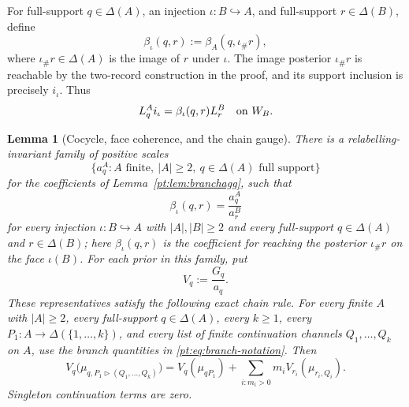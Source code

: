 \documentclass[11pt,a4paper]{article}
\newtheorem{lemma}[theorem]{Lemma}
\theoremstyle{definition}
\newcommand{\D}{\Delta}
\newcommand{\1}{\mathbf 1}
\begin{document}
For full-support $q\in\Delta(A)$, an injection
$\iota:B\hookrightarrow A$, and full-support $r\in\Delta(B)$, define
\[
 \beta_\iota(q,r):=\beta_A(q,\iota_\#r),
\]
where $\iota_\#r\in\D(A)$ is the image of $r$ under $\iota$.  The image posterior $\iota_\#r$ is reachable by the two-record construction
in the proof, and its support inclusion is precisely $i_\iota$.  Thus
\[
 L_q^A i_\iota=\beta_\iota(q,r)L_r^B
 \quad\hbox{on }W_B.
\]

\begin{lemma}[Cocycle, face coherence, and the chain gauge]
\label{pt:lem:chain}
There is a relabelling-invariant family of positive scales
\[
\{a_q^A: A\text{ finite},\ |A|\ge2,\ q\in\Delta(A)\text{ full support}\}
\]
for the coefficients of Lemma~\ref{pt:lem:branchagg}, such that
\begin{equation}
 \beta_\iota(q,r)=\frac{a_q^A}{a_r^B}
\tag{FS}\label{pt:eq:facescale}
\end{equation}
for every injection $\iota:B\hookrightarrow A$ with $|A|,|B|\ge2$ and every
full-support $q\in\Delta(A)$ and $r\in\Delta(B)$; here
$\beta_\iota(q,r)$ is the coefficient for reaching the posterior
$\iota_\#r$ on the face $\iota(B)$.  For each prior in this family, put
\[
 V_q:=\frac{G_q}{a_q}.
\]
These representatives satisfy the following exact chain rule.  For every
finite $A$ with $|A|\ge2$, every full-support $q\in\Delta(A)$, every $k\ge1$,
every $P_1:A\to\Delta(\{1,\ldots,k\})$, and every list of finite continuation
channels $Q_1,\ldots,Q_k$ on $A$, use the branch quantities in
\eqref{pt:eq:branch-notation}.  Then
\begin{equation}
 V_q\bigl(\mu_{q,P_1\triangleright(Q_1,\ldots,Q_k)}\bigr)
 =V_q(\mu_{qP_1})
  +\sum_{i:m_i>0}m_iV_{r_i}(\mu_{r_i,Q_i}).
\tag{CR}\label{pt:eq:chainrule}
\end{equation}
Singleton continuation terms are zero.
\end{lemma}
\end{document}
